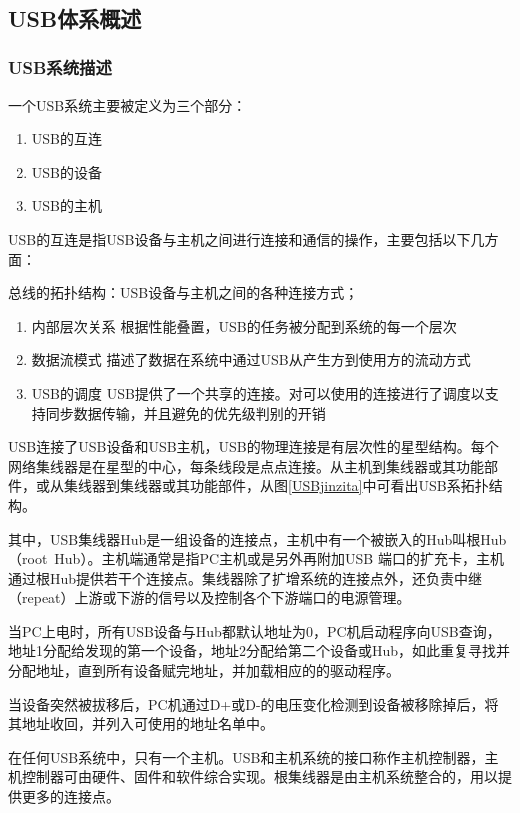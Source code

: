  
\subsection{USB体系概述}
\subsubsection{USB系统描述}
一个USB系统主要被定义为三个部分：
\begin{enumerate}
    \item USB的互连
    \item USB的设备
    \item USB的主机
\end{enumerate}

USB的互连是指USB设备与主机之间进行连接和通信的操作，主要包括以下几方面： 

总线的拓扑结构：USB设备与主机之间的各种连接方式； 

\begin{enumerate}
\item 内部层次关系
根据性能叠置，USB的任务被分配到系统的每一个层次
\item 数据流模式
描述了数据在系统中通过USB从产生方到使用方的流动方式
\item USB的调度
USB提供了一个共享的连接。对可以使用的连接进行了调度以支持同步数据传输，并且避免的优先级判别的开销
\end{enumerate}

USB连接了USB设备和USB主机，USB的物理连接是有层次性的星型结构。每个网络集线器是在星型的中心，每条线段是点点连接。从主机到集线器或其功能部件，或从集线器到集线器或其功能部件，从图\ref{USBjinzita}中可看出USB系拓扑结构。

其中，USB集线器Hub是一组设备的连接点，主机中有一个被嵌入的Hub叫根Hub（root Hub）。主机端通常是指PC主机或是另外再附加USB 端口的扩充卡，主机通过根Hub提供若干个连接点。集线器除了扩增系统的连接点外，还负责中继（repeat）上游或下游的信号以及控制各个下游端口的电源管理。 

当PC上电时，所有USB设备与Hub都默认地址为0，PC机启动程序向USB查询，地址1分配给发现的第一个设备，地址2分配给第二个设备或Hub，如此重复寻找并分配地址，直到所有设备赋完地址，并加载相应的的驱动程序。 

当设备突然被拔移后，PC机通过D+或D-的电压变化检测到设备被移除掉后，将其地址收回，并列入可使用的地址名单中。 

在任何USB系统中，只有一个主机。USB和主机系统的接口称作主机控制器，主机控制器可由硬件、固件和软件综合实现。根集线器是由主机系统整合的，用以提供更多的连接点。 

